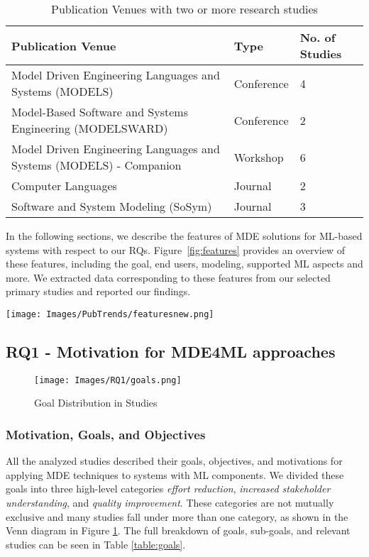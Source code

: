 \begin{table}[htbp]
\centering
\caption{Publication Venues with two or more research studies}
\footnotesize
\begin{tabular}{ p{11cm} p{2cm} p{2cm}} 
\hline
\textbf{Publication Venue} & \textbf{Type} & \textbf{No. of Studies}\TBstrut \\
\hline
Model Driven Engineering Languages and Systems (MODELS) & Conference & 4 \TBstrut \\ 
Model-Based Software and Systems Engineering (MODELSWARD) & Conference & 2 \TBstrut \\
Model Driven Engineering Languages and Systems (MODELS) - Companion  & Workshop  & 6 \TBstrut \\
Computer Languages & Journal & 2  \TBstrut \\
Software and System Modeling (SoSym) & Journal & 3  \TBstrut \\
\hline
\end{tabular}
\label{table:pubTrends}
\end{table}

In the following sections, we describe the features of MDE solutions for ML-based systems with respect to our RQs. Figure~\ref{fig:features} provides an overview of these features, including the goal, end users, modeling, supported ML aspects and more. We extracted data corresponding to these features from our selected primary studies and reported our findings.

\begin{figure*}[htbp]
    \centering
    \texttt{[image: Images/PubTrends/featuresnew.png]}
    \caption{Features of Selected Primary Studies}
    \label{fig:features}
    \vspace*{-1em}
\end{figure*}

\subsection{RQ1 - Motivation for MDE4ML approaches}

\begin{figure}[htbp]
    \centering
    \texttt{[image: Images/RQ1/goals.png]}
    \caption{Goal Distribution in Studies}
    \label{fig:goals}
\end{figure}

\subsubsection{Motivation, Goals, and Objectives}
All the analyzed studies described their goals, objectives, and motivations for applying MDE techniques to systems with ML components. We divided these goals into three high-level categories \textit{effort reduction}, \textit{increased stakeholder understanding}, and \textit{quality improvement}. These categories are not mutually exclusive and many studies fall under more than one category, as shown in the Venn diagram in Figure \ref{fig:goals}. The full breakdown of goals, sub-goals, and relevant studies can be seen in Table \ref{table:goals}. \\

